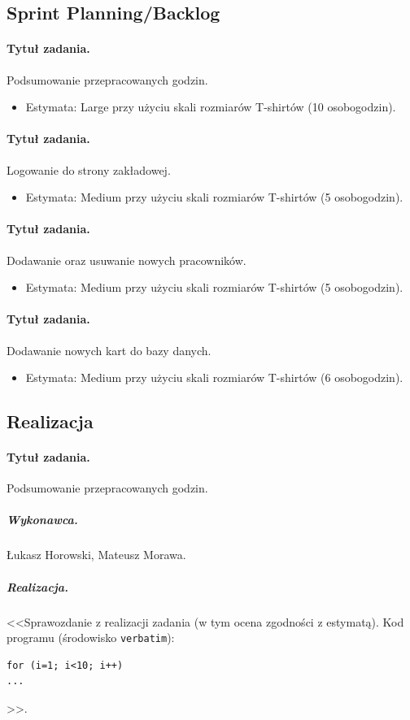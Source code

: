 \documentclass[a4paper]{article}
\begin{document}
\subsection{Sprint Planning/Backlog}

\paragraph{Tytuł zadania.} Podsumowanie przepracowanych godzin.
\begin{itemize}
\item Estymata: Large przy użyciu skali rozmiarów T-shirtów (10 osobogodzin).
\end{itemize}

\paragraph{Tytuł zadania.} Logowanie do strony zakładowej.
\begin{itemize}
	\item Estymata: Medium przy użyciu skali rozmiarów T-shirtów (5 osobogodzin).
\end{itemize}

\paragraph{Tytuł zadania.} Dodawanie oraz usuwanie nowych pracowników.
\begin{itemize}
\item Estymata: Medium przy użyciu skali rozmiarów T-shirtów (5 osobogodzin).
\end{itemize}

\paragraph{Tytuł zadania.} Dodawanie nowych kart do bazy danych.
\begin{itemize}
\item Estymata: Medium przy użyciu skali rozmiarów T-shirtów (6 osobogodzin).
\end{itemize}



\subsection{Realizacja}

\paragraph{Tytuł zadania.} Podsumowanie przepracowanych godzin.
\subparagraph{Wykonawca.} Łukasz Horowski, Mateusz Morawa.
\subparagraph{Realizacja.} <<Sprawozdanie z realizacji zadania (w tym ocena zgodności z estymatą). Kod programu (środowisko \texttt{verbatim}): \begin{verbatim}
for (i=1; i<10; i++)
...
\end{verbatim}>>.
\end{document}
